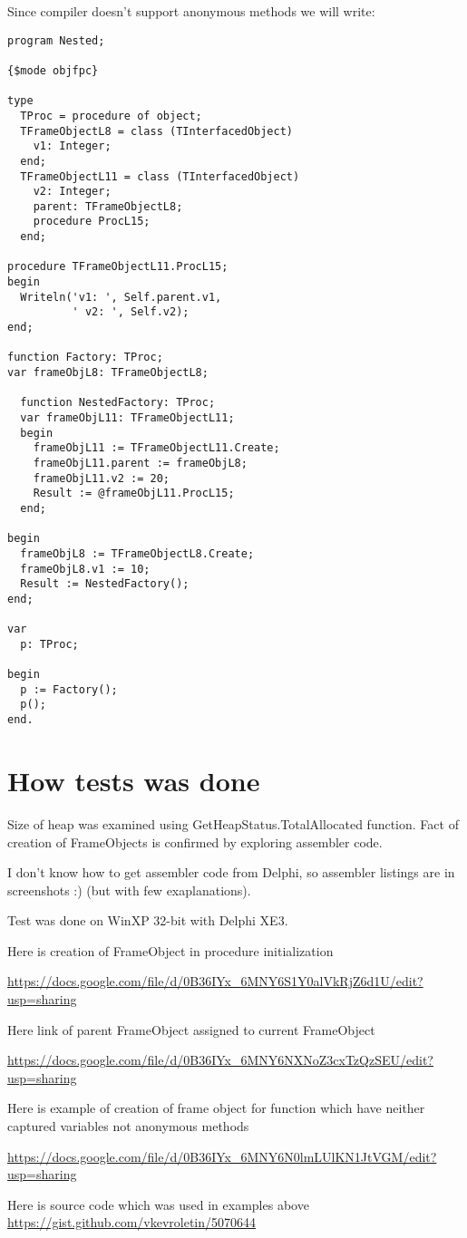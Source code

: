 \documentclass[11pt]{article}
\begin{document}
Since compiler doesn't support anonymous methods we will write:


\begin{verbatim}
program Nested;

{$mode objfpc}

type
  TProc = procedure of object;
  TFrameObjectL8 = class (TInterfacedObject)
    v1: Integer;
  end;
  TFrameObjectL11 = class (TInterfacedObject)
    v2: Integer;
    parent: TFrameObjectL8;
    procedure ProcL15;
  end;

procedure TFrameObjectL11.ProcL15;
begin
  Writeln('v1: ', Self.parent.v1,
          ' v2: ', Self.v2);
end;

function Factory: TProc;
var frameObjL8: TFrameObjectL8;

  function NestedFactory: TProc;
  var frameObjL11: TFrameObjectL11;
  begin
    frameObjL11 := TFrameObjectL11.Create;
    frameObjL11.parent := frameObjL8;
    frameObjL11.v2 := 20;
    Result := @frameObjL11.ProcL15;
  end;

begin
  frameObjL8 := TFrameObjectL8.Create;
  frameObjL8.v1 := 10;
  Result := NestedFactory();
end;

var
  p: TProc;

begin
  p := Factory();
  p();
end.
\end{verbatim}
\section{How tests was done}
\label{sec-8}


Size of heap was examined using GetHeapStatus.TotalAllocated function.
Fact of creation of FrameObjects is confirmed by exploring assembler code.

I don't know how to get assembler code from Delphi, so assembler
listings are in screenshots :) (but with few exaplanations).

Test was done on WinXP 32-bit with Delphi XE3.

Here is creation of FrameObject in procedure initialization

\href{https://docs.google.com/file/d/0B36IYx_6MNY6S1Y0alVkRjZ6d1U/edit?usp=sharing}{https://docs.google.com/file/d/0B36IYx\_6MNY6S1Y0alVkRjZ6d1U/edit?usp=sharing}

Here link of parent FrameObject assigned to current FrameObject

\href{https://docs.google.com/file/d/0B36IYx_6MNY6NXNoZ3cxTzQzSEU/edit?usp=sharing}{https://docs.google.com/file/d/0B36IYx\_6MNY6NXNoZ3cxTzQzSEU/edit?usp=sharing}

Here is example of creation of frame object for function which have
neither captured variables not anonymous methods

\href{https://docs.google.com/file/d/0B36IYx_6MNY6N0lmLUlKN1JtVGM/edit?usp=sharing}{https://docs.google.com/file/d/0B36IYx\_6MNY6N0lmLUlKN1JtVGM/edit?usp=sharing}

Here is source code which was used in examples above
\href{https://gist.github.com/vkevroletin/5070644}{https://gist.github.com/vkevroletin/5070644}
\end{document}
